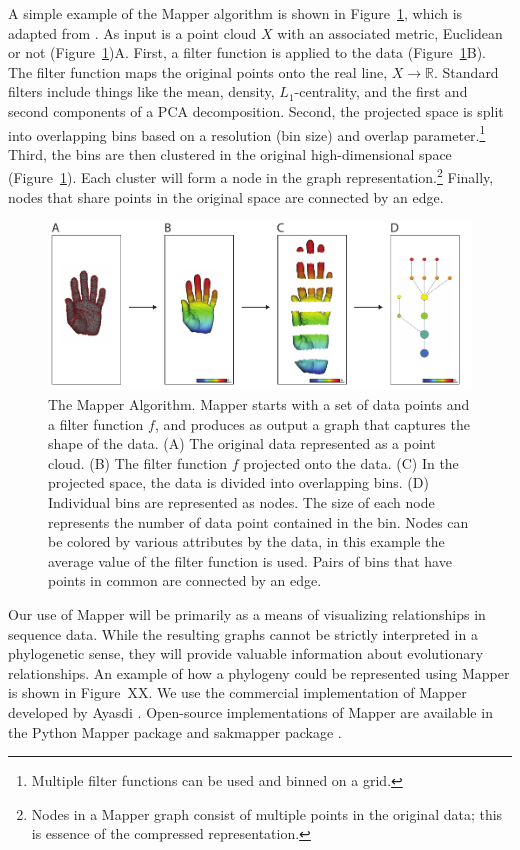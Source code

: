 A simple example of the Mapper algorithm is shown in Figure~\ref{fig:bg:mapper}, which is adapted from \cite{Lum:2013cz}.
As input is a point cloud $X$ with an associated metric, Euclidean or not (Figure~\ref{fig:bg:mapper})A.
First, a filter function is applied to the data (Figure~\ref{fig:bg:mapper}B).
The filter function maps the original points onto the real line, $X\rightarrow\mathbb{R}$.
Standard filters include things like the mean, density, $L_1$-centrality, and the first and second components of a PCA decomposition.
Second, the projected space is split into overlapping bins based on a resolution (bin size) and overlap parameter.\footnote{Multiple filter functions can be used and binned on a grid.}
Third, the bins are then clustered in the original high-dimensional space (Figure~\ref{fig:bg:mapper}).
Each cluster will form a node in the graph representation.\footnote{Nodes in a Mapper graph consist of multiple points in the original data; this is essence of the compressed representation.}
Finally, nodes that share points in the original space are connected by an edge.

\begin{figure}
	\centering
	\includegraphics[]{fig/background/mapper2.pdf}
	\caption[The Mapper Algorithm]{The Mapper Algorithm. Mapper starts with a set of data points and a filter function $f$, and produces as output a graph that captures the shape of the data. (A) The original data represented as a point cloud. (B) The filter function $f$ projected onto the data. (C) In the projected space, the data is divided into overlapping bins. (D) Individual bins are represented as nodes. The size of each node represents the number of data point contained in the bin. Nodes can be colored by various attributes by the data, in this example the average value of the filter function is used. Pairs of bins that have points in common are connected by an edge.}
	\label{fig:bg:mapper}
\end{figure}

Our use of Mapper will be primarily as a means of visualizing relationships in sequence data.
While the resulting graphs cannot be strictly interpreted in a phylogenetic sense, they will provide valuable information about evolutionary relationships.
An example of how a phylogeny could be represented using Mapper is shown in Figure~XX.
We use the commercial implementation of Mapper developed by Ayasdi \cite{AyasdiIris:2015}.
Open-source implementations of Mapper are available in the Python Mapper package \cite{Mullner:2013} and sakmapper package \cite{Zairis:sakmapper:2016}.

